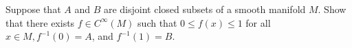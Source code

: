 Suppose that $A$ and $B$ are disjoint closed subsets of a smooth manifold $M$.  Show that there exists $f \in C^{\infty}(M)$ such that $0 \leq f(x) \leq 1$ for all $x \in M, f^{-1}(0) = A$, and $f^{-1}(1) = B$.